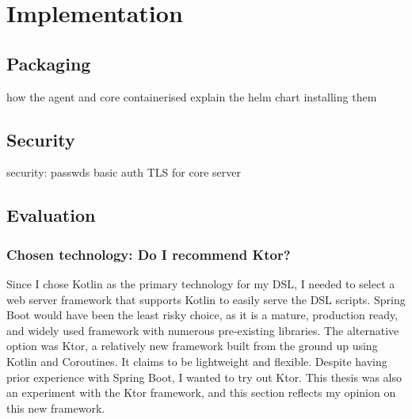 \setlength{\parindent}{0pt}
\setlength{\parskip}{0.6em}

\chapter{Implementation}
\label{chap:archPlan}








\section{Packaging}
how the agent and core containerised
explain the helm chart installing them



\section{Security}
security:
    passwds
        basic auth
    TLS for core server 



\section{Evaluation}

\subsection[Chosen technology]{Chosen technology: Do I recommend Ktor?}

Since I chose Kotlin as the primary technology for my DSL, I needed to select a web server framework that supports Kotlin to easily serve the DSL scripts. Spring Boot would have been the least risky choice, as it is a mature, production ready, and widely used framework with numerous pre-existing libraries. The alternative option was Ktor, a relatively new framework built from the ground up using Kotlin and Coroutines. It claims to be lightweight and flexible. Despite having prior experience with Spring Boot, I wanted to try out Ktor. This thesis was also an experiment with the Ktor framework, and this section reflects my opinion on this new framework.

